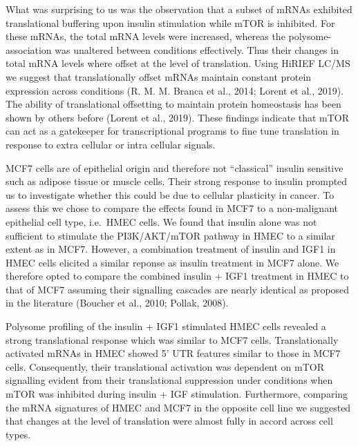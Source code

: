 \documentclass[12pt,openany]{book}
\begin{document}
What was surprising to us was the observation that a subset of mRNAs
exhibited translational buffering upon insulin stimulation while mTOR is
inhibited. For these mRNAs, the total mRNA levels were increased,
whereas the polysome-association was unaltered between conditions
effectively. Thus their changes in total mRNA levels where offset at the
level of translation. Using HiRIEF LC/MS we suggest that translationally
offset mRNAs maintain constant protein expression across conditions (R.
M. M. Branca et al., 2014; Lorent et al., 2019). The ability of
translational offsetting to maintain protein homeostasis has been shown
by others before (Lorent et al., 2019). These findings indicate that
mTOR can act as a gatekeeper for transcriptional programs to fine tune
translation in response to extra cellular or intra cellular signals.

MCF7 cells are of epithelial origin and therefore not ``classical''
insulin sensitive such as adipose tissue or muscle cells. Their strong
response to insulin prompted us to investigate whether this could be due
to cellular plasticity in cancer. To assess this we chose to compare the
effects found in MCF7 to a non-malignant epithelial cell type, i.e.~HMEC
cells. We found that insulin alone was not sufficient to stimulate the
PI3K/AKT/mTOR pathway in HMEC to a similar extent as in MCF7. However, a
combination treatment of insulin and IGF1 in HMEC cells elicited a
similar reponse as insulin treatment in MCF7 alone. We therefore opted
to compare the combined insulin + IGF1 treatment in HMEC to that of MCF7
assuming their signalling cascades are nearly identical as proposed in
the literature (Boucher et al., 2010; Pollak, 2008).

Polysome profiling of the insulin + IGF1 stimulated HMEC cells revealed
a strong translational response which was similar to MCF7 cells.
Translationally activated mRNAs in HMEC showed 5' UTR features similar
to those in MCF7 cells. Consequently, their translational activation was
dependent on mTOR signalling evident from their translational
suppression under conditions when mTOR was inhibited during insulin +
IGF stimulation. Furthermore, comparing the mRNA signatures of HMEC and
MCF7 in the opposite cell line we suggested that changes at the level of
translation were almost fully in accord across cell types.
\end{document}
